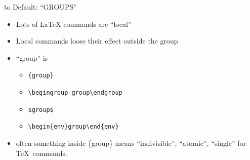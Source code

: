 \begin{frame}[fragile]{to Default: ``GROUPS''}\relax
    \begin{itemize}
    \item Lots of \LaTeX{} commands are ``local''
    \item Local commands loose their effect outside the group 
    \item ``group'' is
    \begin{itemize}
        \item \lstinline[basicstyle=\tt\normalsize]|{group}|
        \item \lstinline[basicstyle=\tt\normalsize]|\begingroup group\endgroup|
        \item \lstinline[basicstyle=\tt\normalsize]|$group$|
        \item \lstinline[basicstyle=\tt\normalsize]|\begin{env}group\end{env}|
    \end{itemize}
    \item often something inside \{group\} means ``indivisible'', ``atomic'', ``single'' for \TeX\ commands.
    \end{itemize}

\end{frame}









